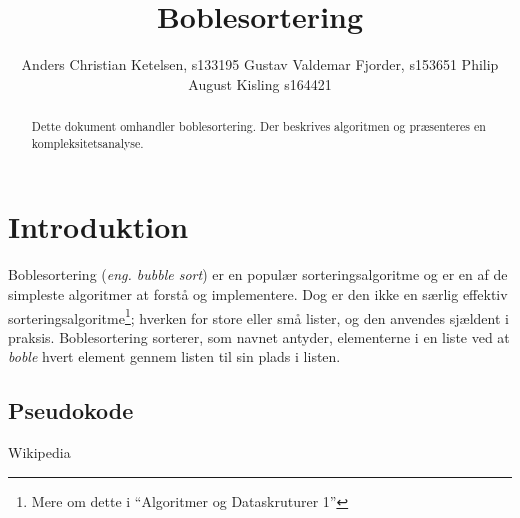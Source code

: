 \documentclass[12pt,a4paper]{article}
\author{Anders Christian Ketelsen, s133195 Gustav Valdemar Fjorder, s153651 Philip August Kisling s164421}
\title{Boblesortering}
\begin{document}
\maketitle
\begin{abstract}
Dette dokument omhandler boblesortering. Der beskrives algoritmen og præsenteres en kompleksitetsanalyse.
\end{abstract}
\section{Introduktion}
Boblesortering (\textsl{eng. bubble sort}) er en populær sorteringsalgoritme og er en af de simpleste algoritmer at forstå og implementere. Dog er den ikke en særlig effektiv sorteringsalgoritme\footnote{Mere om dette i ``Algoritmer og Dataskruturer 1''}; hverken for store eller små lister, og den anvendes sjældent i praksis. Boblesortering sorterer, som navnet antyder, elementerne i en liste ved at \textsl{boble} hvert element gennem listen til sin plads i listen.

\subsection{Pseudokode}

Wikipedia 
\end{document}
